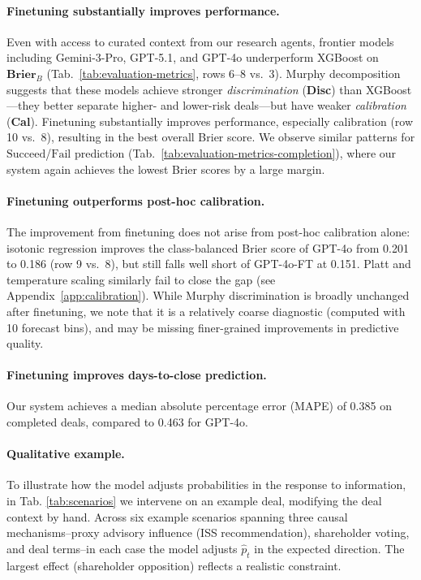 \documentclass{article}
\theoremstyle{plain}
\theoremstyle{definition}
\theoremstyle{remark}
\newcommand{\Succeed}{\boldsymbol{\mathrm{Succeed}}}
\newcommand{\Fail}{\boldsymbol{\mathrm{Fail}}}
\begin{document}
\paragraph{Finetuning substantially improves performance.}
Even with access to curated context from our research agents, frontier models including Gemini-3-Pro, GPT-5.1, and GPT-4o underperform XGBoost on $\mathbf{Brier}_B$ (Tab.~\ref{tab:evaluation-metrics}, rows 6--8 vs.~3). Murphy decomposition suggests that these models achieve stronger \textit{discrimination} (\textbf{Disc}) than XGBoost---they better separate higher- and lower-risk deals---but have weaker \textit{calibration} (\textbf{Cal}). Finetuning substantially improves performance, especially calibration (row 10 vs.~8), resulting in the best overall Brier score. We observe similar patterns for $\Succeed$/$\Fail$ prediction (Tab.~\ref{tab:evaluation-metrics-completion}), where our system again achieves the lowest Brier scores by a large margin. 

\paragraph{Finetuning outperforms post-hoc calibration.}
The improvement from finetuning does not arise from post-hoc calibration alone: isotonic regression \cite{niculescu2005predicting} improves the class-balanced Brier score of GPT-4o from 0.201 to 0.186 (row 9 vs.~8), but still falls well short of GPT-4o-FT at 0.151. Platt and temperature scaling similarly fail to close the gap (see Appendix~\ref{app:calibration}). 
While Murphy discrimination is broadly unchanged after finetuning, we note that it is a relatively coarse diagnostic (computed with 10 forecast bins), and may be missing finer-grained improvements in predictive quality. 

\paragraph{Finetuning improves days-to-close prediction.}
Our system achieves a median absolute percentage error (MAPE) of 0.385 on completed deals, compared to 0.463 for GPT-4o.

\paragraph{Qualitative example.}
To illustrate how the model adjusts probabilities in the response to information, in Tab. \ref{tab:scenarios} we intervene on an example deal, modifying the deal context by hand.
Across six example scenarios spanning three causal mechanisms--proxy advisory influence (ISS recommendation), shareholder voting, and deal terms--in each case the model adjusts $\hat{p}_t$ in the expected direction. The largest effect (shareholder opposition) reflects a realistic constraint.
\end{document}
